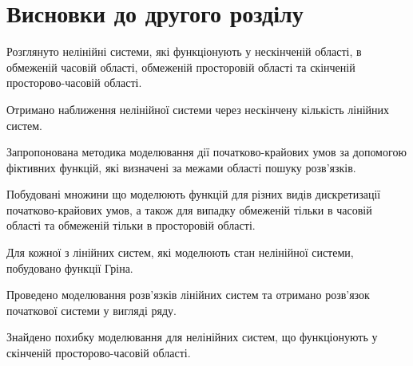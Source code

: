 \section*{Висновки до другого розділу}

Розглянуто нелінійні системи, які функціонують у нескінченій області, в обмеженій часовій області, обмеженій
просторовій області та скінченій просторово-часовій області.

Отримано наближення нелінійної системи через нескінчену кількість лінійних систем.

Запропонована методика моделювання дії початково-крайових умов за допомогою фіктивних функцій, які визначені за
межами області пошуку розв'язків.

Побудовані множини що моделюють функцій для різних видів дискретизації початково-крайових умов, а також для
випадку обмеженій тільки в часовій області та обмеженій тільки в просторовій області.

Для кожної з лінійних систем, які моделюють стан нелінійної системи, побудовано функції Гріна.

Проведено моделювання розв'язків лінійних систем та отримано розв'язок початкової системи у вигляді ряду.

Знайдено похибку моделювання для нелінійних систем, що функціонують у скінченій просторово-часовій області.
